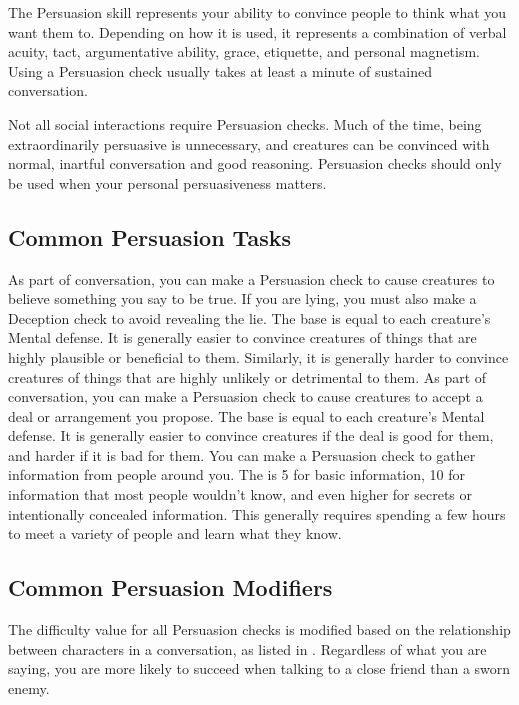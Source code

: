 \newpage
{}
        The Persuasion skill represents your ability to convince people to think what you want them to.
        Depending on how it is used, it represents a combination of verbal acuity, tact, argumentative ability, grace, etiquette, and personal magnetism.
        Using a Persuasion check usually takes at least a minute of sustained conversation.

        Not all social interactions require Persuasion checks. Much of the time, being extraordinarily persuasive is unnecessary, and creatures can be convinced with normal, inartful conversation and good reasoning. Persuasion checks should only be used when your personal persuasiveness matters.

    \subsection{Common Persuasion Tasks}
         As part of conversation, you can make a Persuasion check to cause creatures to believe something you say to be true.
        If you are lying, you must also make a Deception check to avoid revealing the lie.
        The base  is equal to each creature's Mental defense.
        It is generally easier to convince creatures of things that are highly plausible or beneficial to them.
        Similarly, it is generally harder to convince creatures of things that are highly unlikely or detrimental to them.
         As part of conversation, you can make a Persuasion check to cause creatures to accept a deal or arrangement you propose.
        The base  is equal to each creature's Mental defense.
        It is generally easier to convince creatures if the deal is good for them, and harder if it is bad for them.
         You can make a Persuasion check to gather information from people around you.
        The  is 5 for basic information, 10 for information that most people wouldn't know, and even higher for secrets or intentionally concealed information.
        This generally requires spending a few hours to meet a variety of people and learn what they know.

    \subsection{Common Persuasion Modifiers}
        The difficulty value for all Persuasion checks is modified based on the relationship between characters in a conversation, as listed in .
        Regardless of what you are saying, you are more likely to succeed when talking to a close friend than a sworn enemy.

